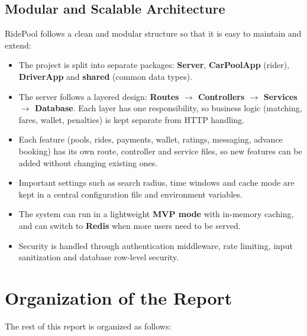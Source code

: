 \subsection{Modular and Scalable Architecture}

RidePool follows a clean and modular structure so that it is easy to maintain
and extend:

\begin{itemize}
  \item The project is split into separate packages: \textbf{Server},
        \textbf{CarPoolApp} (rider), \textbf{DriverApp} and \textbf{shared}
        (common data types).
  \item The server follows a layered design: \textbf{Routes $\rightarrow$
        Controllers $\rightarrow$ Services $\rightarrow$ Database}. Each layer
        has one responsibility, so business logic (matching, fares, wallet,
        penalties) is kept separate from HTTP handling.
  \item Each feature (pools, rides, payments, wallet, ratings, messaging,
        advance booking) has its own route, controller and service files, so
        new features can be added without changing existing ones.
  \item Important settings such as search radius, time windows and cache mode
        are kept in a central configuration file and environment variables.
  \item The system can run in a lightweight \textbf{MVP mode} with in-memory
        caching, and can switch to \textbf{Redis} when more users need to be
        served.
  \item Security is handled through authentication middleware, rate limiting,
        input sanitization and database row-level security.
\end{itemize}

\section{Organization of the Report}
\label{sec:organization}

The rest of this report is organized as follows:

